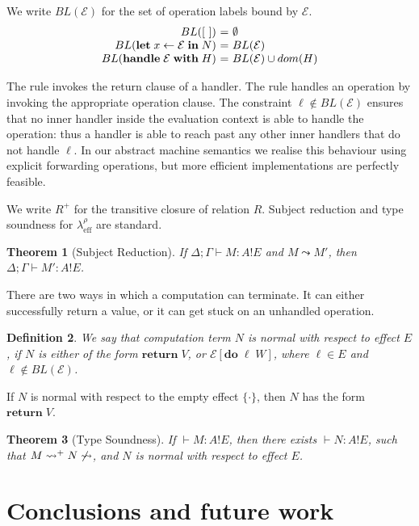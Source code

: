 \documentclass[mscres,cdtppar,twoside,openright,logo,rightchapter,normalheadings]{infthesis}
\makeatletter
\newtheorem{theorem}{Theorem}[section]
\newtheorem{definition}[theorem]{Definition}
\theoremstyle{definition}
\newcommand{\Calc}{\ensuremath{\lambda_{\text{eff}}^\rho}\xspace}
\newcommand{\semlab}[1]{\text{\scshape{S-#1}}}
\newcommand{\revto}{\ensuremath{\leftarrow}}
\newcommand{\keyw}[1]{\textbf{#1}}
\newcommand{\Handle}{\keyw{handle}}
\newcommand{\With}{\keyw{with}}
\newcommand{\Let}{\keyw{let}}
\newcommand{\In}{\keyw{in}}
\newcommand{\Do}{\keyw{do}}
\newcommand{\Return}{\keyw{return}}
\newcommand{\eff}{!}
\newcommand{\typc}[3]{#1 \vdash #2 \eff #3}
\newcommand{\reducesto}[0]{\ensuremath{\leadsto}}
\newcommand{\ba}{\begin{array}}
\newcommand{\ea}{\end{array}}
\newenvironment{equations}{\[\ba{@{}r@{~}c@{~}l@{}}}{\ea\]\ignorespacesafterend}
\makeatother
\begin{document}
We write $BL(\mathcal{E})$ for the set of operation labels bound by
$\mathcal{E}$.
\begin{equations}
BL([~])                            &=& \emptyset \\
BL(\Let\;x \revto \mathcal{E}\;\In\;N)    &=& BL(\mathcal{E}) \\
BL(\Handle\;\mathcal{E}\;\With\;H) &=& BL(\mathcal{E}) \cup dom(H) \\
\end{equations}

The rule \semlab{Handle-Ret} invokes the return clause of a
handler. The rule \semlab{Handle-op} handles an operation by invoking
the appropriate operation clause. The constraint $\ell \notin
BL(\mathcal{E})$ ensures that no inner handler inside the evaluation
context is able to handle the operation: thus a handler is able to
reach past any other inner handlers that do not handle $\ell$. In our
abstract machine semantics we realise this behaviour using explicit
forwarding operations, but more efficient implementations are
perfectly feasible.


We write $R^+$ for the transitive closure of relation $R$.
%
Subject reduction and type soundness for $\Calc$ are standard.

\begin{theorem}[Subject Reduction]
If $\typc{\Delta;\Gamma}{M : A}{E}$ and $M \reducesto M'$, then
$\typc{\Delta;\Gamma}{M' : A}{E}$.
\end{theorem}

There are two ways in which a computation can terminate. It can either
successfully return a value, or it can get stuck on an unhandled
operation.
\begin{definition}
We say that computation term $N$ is normal with respect to effect $E$,
if $N$ is either of the form $\Return\;V$, or
$\mathcal{E}[\Do\;\ell\;W]$, where $\ell \in E$ and $\ell \notin
BL(\mathcal{E})$.
\end{definition}
If $N$ is normal with respect to the empty effect $\{\cdot\}$, then
$N$ has the form $\Return\;V$.

\begin{theorem}[Type Soundness]
If $\typc{}{M : A}{E}$, then there exists $\typc{}{N : A}{E}$, such that
$M \reducesto^+ N \not\reducesto$, and $N$ is normal with respect to
effect $E$.
\end{theorem}

\chapter{Conclusions and future work}
\label{ch:conclusions}
\end{document}
